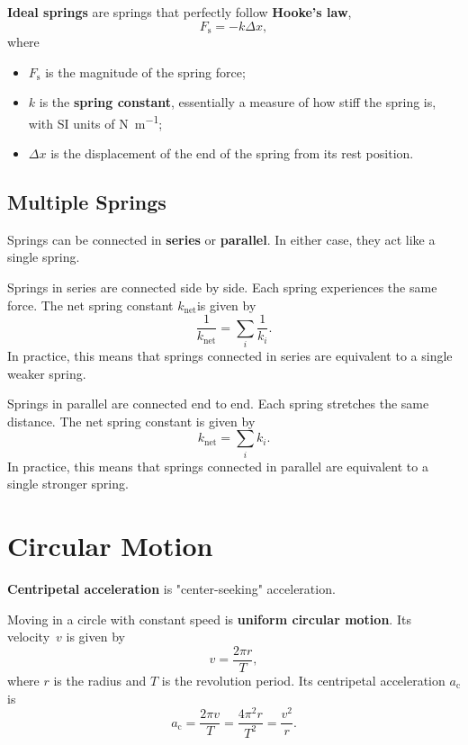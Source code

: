 \textbf{Ideal springs} are springs that perfectly follow \textbf{Hooke's law},
\begin{equation} \label{eq:hookes-law}
    F_\mathrm{s} = - k \Delta{x},
\end{equation}
where
\begin{itemize}
    \item \(F_\mathrm{s}\) is the magnitude of the spring force;
    \item \(k\) is the \textbf{spring constant},
        essentially a measure of how stiff the spring is,
        with SI units of \unit{\newton \per \metre};
    \item \(\Delta{x}\) is the displacement of the end of the spring
        from its rest position.
\end{itemize}

\subsection{Multiple Springs}

Springs can be connected in \textbf{series} or \textbf{parallel}.
In either case, they act like a single spring.

Springs in series are connected side by side.
Each spring experiences the same force.
The net spring constant \(k_\mathrm{net}\)is given by
\begin{equation}
    \frac{1}{k_\mathrm{net}} = \sum_i \frac{1}{k_i}.
\end{equation}
In practice,
this means that springs connected in series are equivalent to a
single weaker spring.

Springs in parallel are connected end to end.
Each spring stretches the same distance.
The net spring constant is given by
\begin{equation}
    k_\mathrm{net} = \sum_i k_i.
\end{equation}
In practice,
this means that springs connected in parallel are equivalent to a
single stronger spring.

\section{Circular Motion}

\textbf{Centripetal acceleration} is "center-seeking" acceleration.

Moving in a circle with constant speed is \textbf{uniform circular motion}.
Its velocity~\(v\) is given by
\begin{equation}
    v = \frac{2 \pi r}{T},
\end{equation}
where \(r\) is the radius and \(T\) is the revolution period.
Its centripetal acceleration \(a_\mathrm{c}\) is
\begin{equation} \label{eq:centripetal-acceleration}
    a_\mathrm{c} = \frac{2 \pi v}{T} = \frac{4 \pi ^2 r}{T^2} = \frac{v^2}{r}.
\end{equation}

